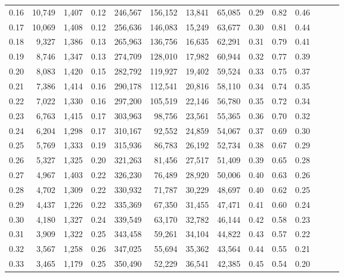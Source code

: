\begin{tabular}{rrrrrrrrrrrrrr}
0.16 &  10,749 &  1,407 &  0.12 &  246,567 &  156,152 &  13,841 &  65,085 &  0.29 &  0.82 &      0.46 \\
0.17 &  10,069 &  1,408 &  0.12 &  256,636 &  146,083 &  15,249 &  63,677 &  0.30 &  0.81 &      0.44 \\
0.18 &   9,327 &  1,386 &  0.13 &  265,963 &  136,756 &  16,635 &  62,291 &  0.31 &  0.79 &      0.41 \\
0.19 &   8,746 &  1,347 &  0.13 &  274,709 &  128,010 &  17,982 &  60,944 &  0.32 &  0.77 &      0.39 \\
0.20 &   8,083 &  1,420 &  0.15 &  282,792 &  119,927 &  19,402 &  59,524 &  0.33 &  0.75 &      0.37 \\
0.21 &   7,386 &  1,414 &  0.16 &  290,178 &  112,541 &  20,816 &  58,110 &  0.34 &  0.74 &      0.35 \\
0.22 &   7,022 &  1,330 &  0.16 &  297,200 &  105,519 &  22,146 &  56,780 &  0.35 &  0.72 &      0.34 \\
0.23 &   6,763 &  1,415 &  0.17 &  303,963 &   98,756 &  23,561 &  55,365 &  0.36 &  0.70 &      0.32 \\
0.24 &   6,204 &  1,298 &  0.17 &  310,167 &   92,552 &  24,859 &  54,067 &  0.37 &  0.69 &      0.30 \\
0.25 &   5,769 &  1,333 &  0.19 &  315,936 &   86,783 &  26,192 &  52,734 &  0.38 &  0.67 &      0.29 \\
0.26 &   5,327 &  1,325 &  0.20 &  321,263 &   81,456 &  27,517 &  51,409 &  0.39 &  0.65 &      0.28 \\
0.27 &   4,967 &  1,403 &  0.22 &  326,230 &   76,489 &  28,920 &  50,006 &  0.40 &  0.63 &      0.26 \\
0.28 &   4,702 &  1,309 &  0.22 &  330,932 &   71,787 &  30,229 &  48,697 &  0.40 &  0.62 &      0.25 \\
0.29 &   4,437 &  1,226 &  0.22 &  335,369 &   67,350 &  31,455 &  47,471 &  0.41 &  0.60 &      0.24 \\
0.30 &   4,180 &  1,327 &  0.24 &  339,549 &   63,170 &  32,782 &  46,144 &  0.42 &  0.58 &      0.23 \\
0.31 &   3,909 &  1,322 &  0.25 &  343,458 &   59,261 &  34,104 &  44,822 &  0.43 &  0.57 &      0.22 \\
0.32 &   3,567 &  1,258 &  0.26 &  347,025 &   55,694 &  35,362 &  43,564 &  0.44 &  0.55 &      0.21 \\
0.33 &   3,465 &  1,179 &  0.25 &  350,490 &   52,229 &  36,541 &  42,385 &  0.45 &  0.54 &      0.20 \\

\end{tabular}
